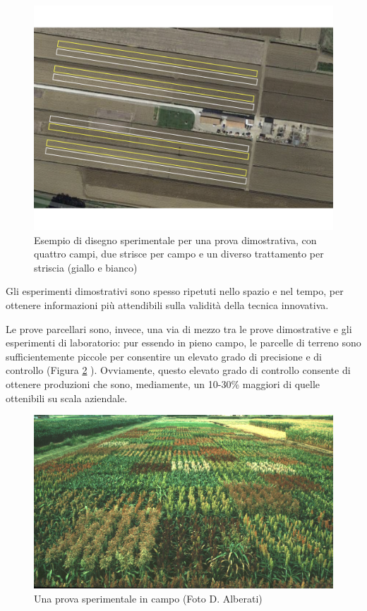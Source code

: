 \documentclass[a4paper,12pt,oneside]{book}
\begin{document}
\begin{figure}

{\centering \includegraphics[width=0.9\linewidth]{_images/OnFarmTrial} 

}

\caption{Esempio di disegno sperimentale per una prova dimostrativa, con quattro campi, due strisce per campo e un diverso trattamento per striscia (giallo e bianco)}\label{fig:figName30a}
\end{figure}

Gli esperimenti dimostrativi sono spesso ripetuti nello spazio e nel tempo, per ottenere informazioni più attendibili sulla validità della tecnica innovativa.

Le prove parcellari sono, invece, una via di mezzo tra le prove dimostrative e gli esperimenti di laboratorio: pur essendo in pieno campo, le parcelle di terreno sono sufficientemente piccole per consentire un elevato grado di precisione e di controllo (Figura \ref{fig:figName21} ). Ovviamente, questo elevato grado di controllo consente di ottenere produzioni che sono, mediamente, un 10-30\% maggiori di quelle ottenibili su scala aziendale.

\begin{figure}

{\centering \includegraphics[width=0.9\linewidth]{_images/SorgoProveVarietali} 

}

\caption{Una prova sperimentale in campo (Foto D. Alberati)}\label{fig:figName21}
\end{figure}
\end{document}
